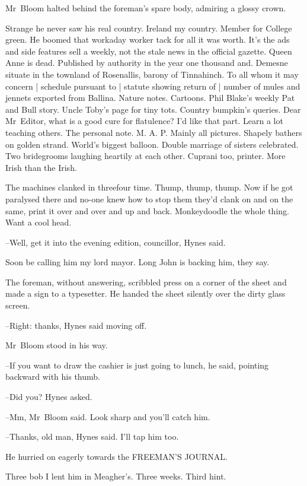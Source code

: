 
Mr~Bloom halted behind the foreman's spare body,
admiring a glossy crown.

Strange he never saw his real country.
Ireland my country.
Member for College green.
He boomed that workaday worker tack for all it was worth.
It's the ads and side features sell a weekly,
not the stale news in the official gazette.
Queen Anne is dead.
Published by authority in the year one thousand and.
Demesne situate in the townland of Rosenallis,
barony of Tinnahinch.
To all whom it may concern |
schedule pursuant to |
statute showing return of |
number of mules and jennets exported from Ballina.
Nature notes.
Cartoons.
Phil Blake's weekly Pat and Bull story.
Uncle Toby's page for tiny tots.
Country bumpkin's queries.
Dear Mr~Editor, what is a good cure for flatulence?
I'd like that part.
Learn a lot teaching others.
The personal note.
M. A. P. Mainly all pictures.
Shapely bathers on golden strand.
World's biggest balloon.
Double marriage of sisters celebrated.
Two bridegrooms laughing heartily at each other.
Cuprani too, printer.
More Irish than the Irish.

The machines clanked in threefour time.
Thump, thump, thump.
Now if he got paralysed there
and no-one knew how to stop them
they'd clank on and on the same,
print it over and over and up and back.
Monkeydoodle the whole thing.
Want a cool head.

--Well, get it into the evening edition, councillor,
Hynes said.

Soon be calling him my lord mayor.
Long John is backing him, they say.

The foreman, without answering,
scribbled press on a corner of the sheet
and made a sign to a typesetter.
He handed the sheet silently over the dirty glass screen.

--Right: thanks,
Hynes said moving off.

Mr~Bloom stood in his way.

--If you want to draw the cashier is just going to lunch,
he said,
pointing backward with his thumb.

--Did you?
Hynes asked.

--Mm,
Mr~Bloom said.
Look sharp and you'll catch him.

--Thanks, old man,
Hynes said.
I'll tap him too.

He hurried on eagerly towards the FREEMAN'S JOURNAL.

Three bob I lent him in Meagher's.
Three weeks.
Third hint.


